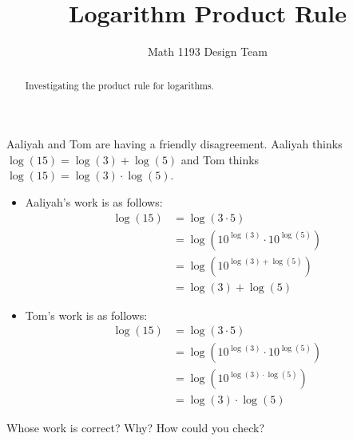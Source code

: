 \documentclass[noauthor]{ximera}
\title{Logarithm Product Rule}
\author{Math 1193 Design Team}
\begin{document}
\begin{abstract}
    Investigating the product rule for logarithms.
\end{abstract}
\maketitle

Aaliyah and Tom are having a friendly disagreement. Aaliyah thinks
\(\log(15) = \log(3) + \log(5)\) and Tom thinks
\(\log(15) = \log(3) \cdot \log(5)\).

\begin{itemize}
    \item Aaliyah's work is as follows:
    \begin{align*}
        \log(15) & = \log(3 \cdot 5) \\
        & = \log(10^{\log(3)} \cdot 10^{\log(5)}) \\
        & = \log(10^{\log(3) + \log(5)}) \\
        & = \log(3) + \log(5)
    \end{align*}
    \item Tom's work is as follows:
    \begin{align*}
        \log(15) & = \log(3 \cdot 5) \\
        & = \log(10^{\log(3)} \cdot 10^{\log(5)}) \\
        & = \log(10^{\log(3) \cdot \log(5)}) \\
        & = \log(3) \cdot \log(5)
    \end{align*}
\end{itemize}

Whose work is correct? Why? How could you check?
\end{document}
